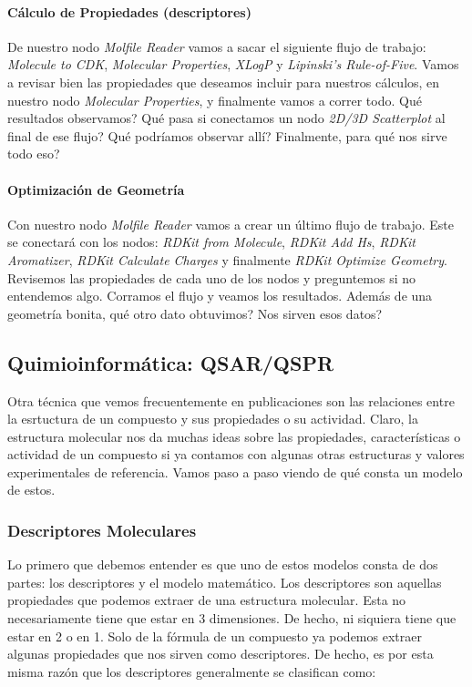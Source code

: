 \documentclass[10pt,letterpaper]{article}
\begin{document}
\paragraph{C\'alculo de Propiedades (descriptores)}
De nuestro nodo \emph{Molfile Reader} vamos a sacar el siguiente flujo de trabajo: \emph{Molecule to CDK}, \emph{Molecular Properties}, \emph{XLogP} y \emph{Lipinski's Rule-of-Five}. Vamos a revisar bien las propiedades que deseamos incluir para nuestros c\'alculos, en nuestro nodo \emph{Molecular Properties}, y finalmente vamos a correr todo. Qu\'e resultados observamos? Qu\'e pasa si conectamos un nodo \emph{2D/3D Scatterplot} al final de ese flujo? Qu\'e podr\'iamos observar all\'i? Finalmente, para qu\'e nos sirve todo eso?

\paragraph{Optimizaci\'on de Geometr\'ia}
Con nuestro nodo \emph{Molfile Reader} vamos a crear un \'ultimo flujo de trabajo. Este se conectar\'a con los nodos: \emph{RDKit from Molecule}, \emph{RDKit Add Hs}, \emph{RDKit Aromatizer}, \emph{RDKit Calculate Charges} y finalmente \emph{RDKit Optimize Geometry}. Revisemos las propiedades de cada uno de los nodos y preguntemos si no entendemos algo. Corramos el flujo y veamos los resultados. Adem\'as de una geometr\'ia bonita, qu\'e otro dato obtuvimos? Nos sirven esos datos?

\subsection{Quimioinform\'atica: QSAR/QSPR}
Otra t\'ecnica que vemos frecuentemente en publicaciones son las relaciones entre la esrtuctura de un compuesto y sus propiedades o su actividad. Claro, la estructura molecular nos da muchas ideas sobre las propiedades, caracter\'isticas o actividad de un compuesto si ya contamos con algunas otras estructuras y valores experimentales de referencia. Vamos paso a paso viendo de qu\'e consta un modelo de estos.\\

\subsubsection{Descriptores Moleculares}
Lo primero que debemos entender es que uno de estos modelos consta de dos partes: los descriptores y el modelo matem\'atico. Los descriptores son aquellas propiedades que podemos extraer de una estructura molecular. Esta no necesariamente tiene que estar en 3 dimensiones. De hecho, ni siquiera tiene que estar en 2 o en 1. Solo de la f\'ormula de un compuesto ya podemos extraer algunas propiedades que nos sirven como descriptores. De hecho, es por esta misma raz\'on que los descriptores generalmente se clasifican como:
\end{document}
